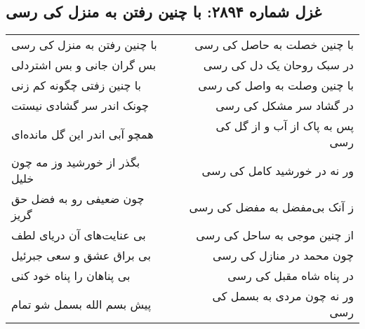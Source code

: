 \begin{center}
\section*{غزل شماره ۲۸۹۴: با چنین رفتن به منزل کی رسی}
\label{sec:2894}
\begin{longtable}{l p{0.5cm} r}
با چنین رفتن به منزل کی رسی
&&
با چنین خصلت به حاصل کی رسی
\\
بس گران جانی و بس اشتردلی
&&
در سبک روحان یک دل کی رسی
\\
با چنین زفتی چگونه کم زنی
&&
با چنین وصلت به واصل کی رسی
\\
چونک اندر سر گشادی نیستت
&&
در گشاد سر مشکل کی رسی
\\
همچو آبی اندر این گل مانده‌ای
&&
پس به پاک از آب و از گل کی رسی
\\
بگذر از خورشید وز مه چون خلیل
&&
ور نه در خورشید کامل کی رسی
\\
چون ضعیفی رو به فضل حق گریز
&&
ز آنک بی‌مفضل به مفضل کی رسی
\\
بی عنایت‌های آن دریای لطف
&&
از چنین موجی به ساحل کی رسی
\\
بی براق عشق و سعی جبرئیل
&&
چون محمد در منازل کی رسی
\\
بی پناهان را پناه خود کنی
&&
در پناه شاه مقبل کی رسی
\\
پیش بسم الله بسمل شو تمام
&&
ور نه چون مردی به بسمل کی رسی
\\
\end{longtable}
\end{center}
